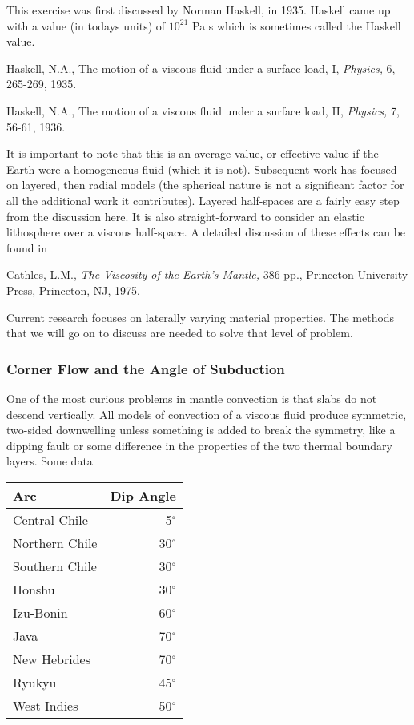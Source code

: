 \documentclass[12pt,twoside]{article}
\begin{document}
This exercise was first discussed by Norman Haskell, in 1935.  Haskell came up
with a value (in todays units) of $10^{21}$ Pa s which is sometimes called the
Haskell value. 

\medskip
\noindent
Haskell, N.A., The motion of a viscous fluid under a surface load, I,
{\em Physics,} 6, 265-269, 1935. 

\medskip
\noindent
Haskell, N.A., The motion of a viscous fluid under a surface load, II, 
{\em Physics,} 7, 56-61, 1936.

It is important to note that this is an average value, or effective value if
the Earth were a homogeneous fluid (which it is not).  Subsequent work has
focused on layered, then radial models (the spherical nature is not a
significant factor for all the additional work it contributes).  Layered
half-spaces are a fairly easy step from the discussion here.  It is also
straight-forward to consider an elastic lithosphere over a viscous half-space.
A detailed discussion of these effects can be found in

\medskip
\noindent
Cathles, L.M., {\em The Viscosity of the Earth's Mantle,} 386 pp., Princeton
University Press, Princeton, NJ, 1975.

\medskip

Current research focuses on laterally varying material properties.   The
methods that we will go on to discuss are needed to solve that level of problem.

\subsubsection{Corner Flow and the Angle of Subduction}

One of the most curious problems in mantle convection is that slabs do not
descend vertically.   All models of convection of a viscous fluid produce
symmetric, two-sided downwelling unless something is added to break the
symmetry, like a dipping fault or some difference in the properties of the two
thermal boundary layers.  Some data

\begin{center}
\begin{tabular}{||l|r||} \hline 
Arc & Dip Angle\\ \hline
Central Chile  &  5$^\circ$ \\
Northern Chile & 30$^\circ$ \\
Southern Chile & 30$^\circ$ \\
Honshu         & 30$^\circ$ \\
Izu-Bonin      & 60$^\circ$ \\
Java           & 70$^\circ$ \\
New Hebrides   & 70$^\circ$ \\
Ryukyu         & 45$^\circ$ \\
West Indies    & 50$^\circ$ \\ \hline
\end{tabular}
\end{center}
\end{document}
